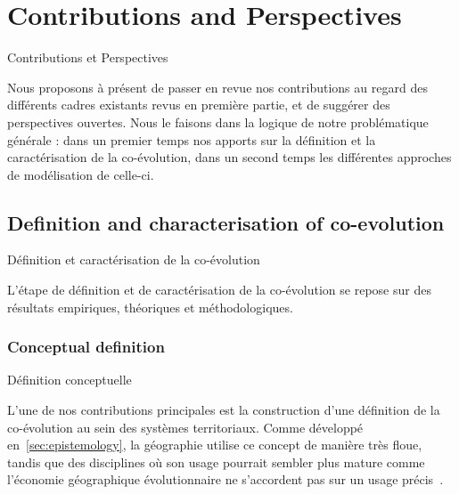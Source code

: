 




\newpage


\section{Contributions and Perspectives}{Contributions et Perspectives}

\label{sec:contributions}



Nous proposons à présent de passer en revue nos contributions au regard des différents cadres existants revus en première partie, et de suggérer des perspectives ouvertes. Nous le faisons dans la logique de notre problématique générale : dans un premier temps nos apports sur la définition et la caractérisation de la co-évolution, dans un second temps les différentes approches de modélisation de celle-ci.



\subsection{Definition and characterisation of co-evolution}{Définition et caractérisation de la co-évolution}


L'étape de définition et de caractérisation de la co-évolution se repose sur des résultats empiriques, théoriques et méthodologiques.


\subsubsection{Conceptual definition}{Définition conceptuelle}

L'une de nos contributions principales est la construction d'une définition de la co-évolution au sein des systèmes territoriaux. Comme développé en~\ref{sec:epistemology}, la géographie utilise ce concept de manière très floue, tandis que des disciplines où son usage pourrait sembler plus mature comme l'économie géographique évolutionnaire ne s'accordent pas sur un usage précis~\cite{schamp201020}.

